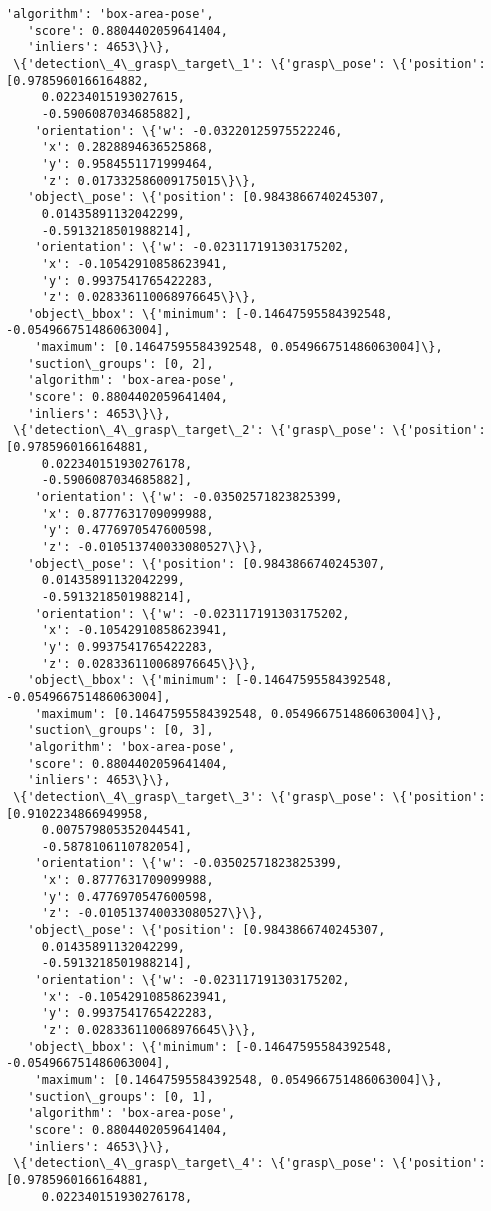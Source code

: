 \documentclass[11pt]{article}
\begin{document}
\begin{tcolorbox}[breakable, size=fbox, boxrule=.5pt, pad at break*=1mm, opacityfill=0]
\begin{Verbatim}[commandchars=\\\{\}]
   'algorithm': 'box-area-pose',
   'score': 0.8804402059641404,
   'inliers': 4653\}\},
 \{'detection\_4\_grasp\_target\_1': \{'grasp\_pose': \{'position': [0.9785960166164882,
     0.02234015193027615,
     -0.5906087034685882],
    'orientation': \{'w': -0.03220125975522246,
     'x': 0.2828894636525868,
     'y': 0.9584551171999464,
     'z': 0.017332586009175015\}\},
   'object\_pose': \{'position': [0.9843866740245307,
     0.01435891132042299,
     -0.5913218501988214],
    'orientation': \{'w': -0.023117191303175202,
     'x': -0.10542910858623941,
     'y': 0.9937541765422283,
     'z': 0.028336110068976645\}\},
   'object\_bbox': \{'minimum': [-0.14647595584392548, -0.054966751486063004],
    'maximum': [0.14647595584392548, 0.054966751486063004]\},
   'suction\_groups': [0, 2],
   'algorithm': 'box-area-pose',
   'score': 0.8804402059641404,
   'inliers': 4653\}\},
 \{'detection\_4\_grasp\_target\_2': \{'grasp\_pose': \{'position': [0.9785960166164881,
     0.022340151930276178,
     -0.5906087034685882],
    'orientation': \{'w': -0.03502571823825399,
     'x': 0.8777631709099988,
     'y': 0.4776970547600598,
     'z': -0.010513740033080527\}\},
   'object\_pose': \{'position': [0.9843866740245307,
     0.01435891132042299,
     -0.5913218501988214],
    'orientation': \{'w': -0.023117191303175202,
     'x': -0.10542910858623941,
     'y': 0.9937541765422283,
     'z': 0.028336110068976645\}\},
   'object\_bbox': \{'minimum': [-0.14647595584392548, -0.054966751486063004],
    'maximum': [0.14647595584392548, 0.054966751486063004]\},
   'suction\_groups': [0, 3],
   'algorithm': 'box-area-pose',
   'score': 0.8804402059641404,
   'inliers': 4653\}\},
 \{'detection\_4\_grasp\_target\_3': \{'grasp\_pose': \{'position': [0.9102234866949958,
     0.007579805352044541,
     -0.5878106110782054],
    'orientation': \{'w': -0.03502571823825399,
     'x': 0.8777631709099988,
     'y': 0.4776970547600598,
     'z': -0.010513740033080527\}\},
   'object\_pose': \{'position': [0.9843866740245307,
     0.01435891132042299,
     -0.5913218501988214],
    'orientation': \{'w': -0.023117191303175202,
     'x': -0.10542910858623941,
     'y': 0.9937541765422283,
     'z': 0.028336110068976645\}\},
   'object\_bbox': \{'minimum': [-0.14647595584392548, -0.054966751486063004],
    'maximum': [0.14647595584392548, 0.054966751486063004]\},
   'suction\_groups': [0, 1],
   'algorithm': 'box-area-pose',
   'score': 0.8804402059641404,
   'inliers': 4653\}\},
 \{'detection\_4\_grasp\_target\_4': \{'grasp\_pose': \{'position': [0.9785960166164881,
     0.022340151930276178,

\end{Verbatim}
\end{tcolorbox}
\end{document}
